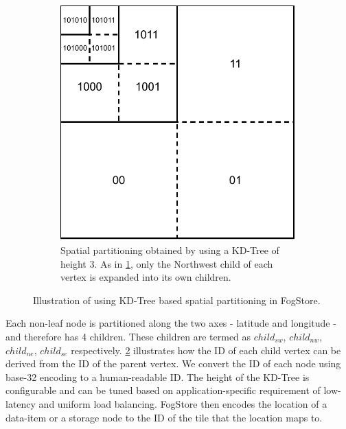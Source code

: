 \begin{figure}[ht]
\begin{subfigure}[b]{0.45\linewidth}
    \label{fig:fogstore_kd_tree}
  \end{subfigure}
  ~~~~
  \begin{subfigure}[b]{0.45\linewidth}
    \includegraphics[width=\linewidth]{figures/fogstore/tile_ids.pdf}
    \caption{Spatial partitioning obtained by using a KD-Tree of height 3. As in \cref{fig:fogstore_kd_tree}, only the Northwest child of each vertex is expanded into its own children.}
    \label{fig:fogstore_tile_ids}
  \end{subfigure}
  \caption{Illustration of using KD-Tree based spatial partitioning in FogStore.}
  \label{fig:fogstore_partitioning}
\end{figure}
Each non-leaf node is partitioned along the two axes - latitude and longitude - and therefore has 4 children. These children are termed as $child_{sw}$, $child_{nw}$, $child_{ne}$, $child_{se}$ respectively. \cref{fig:fogstore_tile_ids} illustrates how the ID of each child vertex can be derived from the ID of the parent vertex. We convert the ID of each node using base-32 encoding to a human-readable ID.
The height of the KD-Tree is configurable and can be tuned based on application-specific requirement of low-latency and uniform load balancing.
FogStore then encodes the location of a data-item or a storage node to the ID of the tile that the location maps to.


